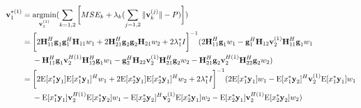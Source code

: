\documentclass[11pt, oneside]{article}   	%
\begin{document}
\begin{align*}
\textbf{v}^{*(1)}_{1}  &= \operatornamewithlimits{argmin}_{\textbf{v}^{(1)}_{1}}	(\displaystyle\sum_{k=1,2} 	\bigg[	MSE_{k}	+	\lambda_{k}	(\displaystyle\sum_{j=1,2}	\|	\textbf{v}^{(j)}_{k}	\|	-P	)	\bigg])	\\
			       &=\bigg[ 2	\textbf{H}^{H}_{11}	\textbf{g}_{1}	\textbf{g}^{H}_{1}		\textbf{H}_{11}	w_1
				   +	2	\textbf{H}^{H}_{21}	\textbf{g}_{2}	\textbf{g}_{2}		\textbf{H}_{21}	w_2	+2	\lambda^{*}_1 I
				   \bigg]^{-1} 
				   (
				   2	\textbf{H}^{H}_{11}	\textbf{g}_{1}	w_1	
				   -\textbf{g}^{H}_{1}	\textbf{H}_{12}	\textbf{v}^{(1)}_{2} 	\textbf{H}^{H}_{11}	\textbf{g}_{1}	w_1	\\
				   &\ \ \ \ 
				   -	\textbf{H}^{H}_{11}	\textbf{g}_{1}	\textbf{v}^{H(1)}_{2}	\textbf{H}^{H}_{12}	\textbf{g}_{1}	w_1
				   -	\textbf{g}^{H}_{2}	\textbf{H}_{22}	\textbf{v}^{(1)}_{2} 	\textbf{H}^{H}_{21}	\textbf{g}_{2}	w_2
				   -	\textbf{H}^{H}_{21}	\textbf{g}_{2}	\textbf{v}^{H(1)}_{2}	\textbf{H}^{H}_{22}	\textbf{g}_{2}	w_2
				   )\\
			      &=\bigg[	2	\mathrm{E}[x^*_1	\textbf{y}_1]	\mathrm{E}[x^*_1	\textbf{y}_1]^H	w_1
			      			+	2	\mathrm{E}[x^*_2	\textbf{y}_1]	\mathrm{E}[x^*_2	\textbf{y}_1]^H	w_2	+2	\lambda^{*}_1 I
			      	  \bigg]^{-1} 
				  (2	\mathrm{E}[x^*_1	\textbf{y}_1]	w_1
				  -\mathrm{E}[x^*_1	\textbf{y}_2]^H	\textbf{v}^{(1)}_{2} 	\mathrm{E}[x^*_1	\textbf{y}_1]	w_1	\\
				  &\ \ \ \ 	
				  -\mathrm{E}[x^*_1	\textbf{y}_1]	\textbf{v}^{H(1)}_{2} 	\mathrm{E}[x^*_1	\textbf{y}_2]	w_1	
				  -\mathrm{E}[x^*_2	\textbf{y}_2]^H	\textbf{v}^{(1)}_{2} 	\mathrm{E}[x^*_2	\textbf{y}_1]	w_2
				   -\mathrm{E}[x^*_2	\textbf{y}_1]	\textbf{v}^{H(1)}_{2} 	\mathrm{E}[x^*_2	\textbf{y}_2]	w_2	
				   )
\end{align*}
\end{document}
